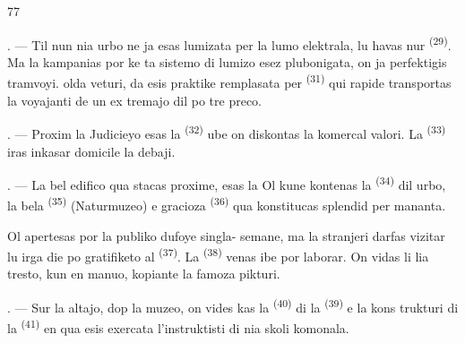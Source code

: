 \begin{VUpage}[79]{77}
\VUsaut{4.0mm}
\VUsaut{3.4mm}

. --- Til nun nia urbo ne ja esas lumizata\nl
per la lumo elektrala, lu havas nur \cc
{} \textsuperscript{(29)}. Ma la  kampanias por\nl
ke ta sistemo di lumizo esez plubonigata, \nl
on ja perfektigis \nl
tramvoyi.  olda veturi,  da  esis\nl
praktike remplasata per  \textsuperscript{(31)}\nl
qui rapide transportas la voyajanti de un ex\cc
tremajo dil  po tre  preco.

. --- Proxim la Judicieyo esas la  \textsuperscript{(32)}\nl
ube on diskontas la komercal valori. La \cc
{} \textsuperscript{(33)} iras inkasar domicile la\nl
debaji.

\VUsaut{4.0mm}
\VUsaut{3.4mm}

. --- La bel edifico qua stacas proxime,\nl
esas la  Ol kune kontenas la \cc
{} \textsuperscript{(34)} dil urbo, la bela \cc
{} \textsuperscript{(35)} (Naturmuzeo) e gracioza \cc
{} \textsuperscript{(36)} qua konstitucas splendid  per\cc
mananta.

\VUblancAlinea
Ol apertesas por la publiko dufoye singla-\nl
semane, ma la stranjeri darfas vizitar lu irga\cc
die po gratifiketo al  \textsuperscript{(37)}. La \cc
{} \textsuperscript{(38)} venas ibe por laborar. On vidas li \nl
lia tresto, kun  en manuo, kopiante\nl
la famoza pikturi.

. --- Sur la altajo, dop la muzeo, on vides\cc
kas la  \textsuperscript{(40)} di la  \textsuperscript{(39)} e la kons\cc
trukturi di la  \textsuperscript{(41)} en qua esis\nl
exercata l'instruktisti di nia skoli komonala.
\end{VUpage}

